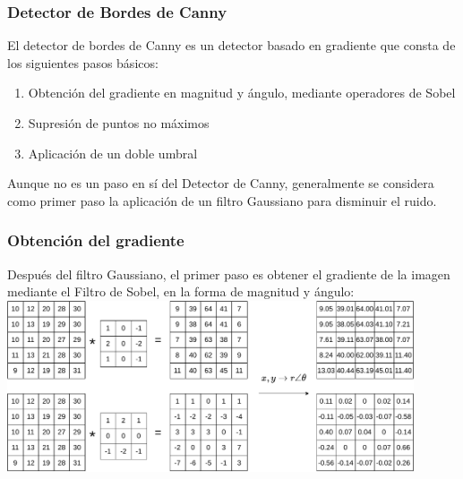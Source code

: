 \begin{frame}\frametitle{Detector de Bordes de Canny}
  El detector de bordes de Canny es un detector basado en gradiente que consta de los siguientes pasos básicos:
  \begin{enumerate}
  \item Obtención del gradiente en magnitud y ángulo, mediante operadores de Sobel
  \item Supresión de puntos no máximos
  \item Aplicación de un doble umbral
  \end{enumerate}
  Aunque no es un paso en sí del Detector de Canny, generalmente se considera como primer paso la aplicación de un filtro Gaussiano para disminuir el ruido. 
\end{frame}

\begin{frame}\frametitle{Obtención del gradiente}
  Después del filtro Gaussiano, el primer paso es obtener el gradiente de la imagen mediante el Filtro de Sobel, en la forma de magnitud y ángulo:\\
  \includegraphics[width=0.9\textwidth]{Figuras/SobelXY.pdf}
\end{frame}

